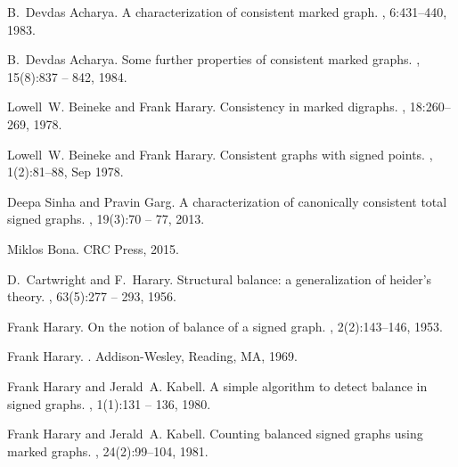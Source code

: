 \documentclass[12pt, a4paper]{report}
\theoremstyle{fordefn}
\begin{document}
%  

\begin{thebibliography}{10}
% 
B.~Devdas Acharya.
\newblock A characterization of consistent marked graph.
, 6:431--440, 1983.

B.~Devdas Acharya.
\newblock Some further properties of consistent marked graphs.
, 15(8):837 --
  842, 1984.

Lowell~W. Beineke and Frank Harary.
\newblock Consistency in marked digraphs.
, 18:260--269, 1978.

Lowell~W. Beineke and Frank Harary.
\newblock Consistent graphs with signed points.
,
  1(2):81--88, Sep 1978.
  
Deepa Sinha and Pravin Garg.
\newblock A characterization of canonically consistent total signed graphs.
, 19(3):70 --
  77, 2013.

Miklos Bona.
\newblock CRC Press, 2015.

D.~Cartwright and F.~Harary.
\newblock Structural balance: a generalization of heider's theory.
, 63(5):277 -- 293, 1956.


Frank Harary.
\newblock On the notion of balance of a signed graph.
, 2(2):143--146, 1953.

Frank Harary.
.
\newblock Addison-Wesley, Reading, MA, 1969.

Frank Harary and Jerald~A. Kabell.
\newblock A simple algorithm to detect balance in signed graphs.
, 1(1):131 -- 136, 1980.

Frank Harary and Jerald~A. Kabell.
\newblock Counting balanced signed graphs using marked graphs.
,
  24(2):99–104, 1981.


\end{thebibliography}
\end{document}
